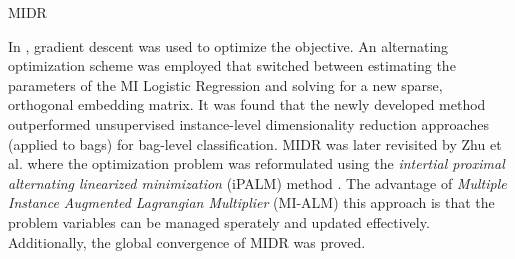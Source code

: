 \begin{algorithm}[h!]
	\caption{MIDR}
	\label{alg:MIDR}
	\begin{algorithmic}[1]
		\EndFor
		\EndWhile            
	\end{algorithmic}
\end{algorithm}

In \citep{Sun2010MIDR}, gradient descent was used to optimize the objective.  An alternating optimization scheme was employed that switched between estimating the parameters of the MI Logistic Regression and solving for a new sparse, orthogonal embedding  matrix.  It was found that the newly developed method outperformed unsupervised instance-level dimensionality reduction approaches (applied to bags) for bag-level classification.  MIDR was later revisited by Zhu et al. where the optimization problem was reformulated using the \textit{intertial proximal alternating linearized minimization} (iPALM) method \citep{Zhu2018MIDRSparsity}.  The advantage of \textit{Multiple Instance Augmented Lagrangian Multiplier} (MI-ALM) this approach is that the problem variables can be managed sperately and updated effectively.  Additionally, the global convergence of MIDR was proved. 

